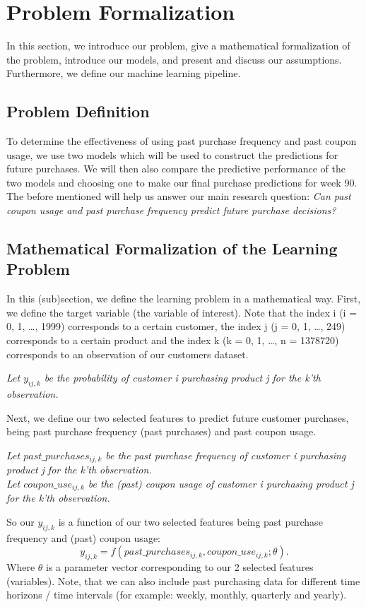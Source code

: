 \section{Problem Formalization}
In this section, we introduce our problem, give a mathematical formalization of
the problem, introduce our models, and present and discuss our assumptions.
Furthermore, we define our machine learning pipeline.

\subsection{Problem Definition}
To determine the effectiveness of using past purchase frequency and past coupon
usage, we use two models which will be used to construct the predictions for
future purchases. We will then also compare the predictive performance of the
two models and choosing one to make our final purchase predictions for week 90.
The before mentioned will help us answer our main research question:
\textit{Can past coupon usage and past purchase frequency predict future purchase decisions?}

\subsection{Mathematical Formalization of the Learning Problem}
In this (sub)section, we define the learning problem in a mathematical way.
First, we define the target variable (the variable of interest). Note that the
index i (i = 0, 1, \dots, 1999) corresponds to a certain customer, the index j (j = 0,
1, \dots, 249) corresponds to a certain product and the index k (k = 0, 1,
\dots, n = 1378720) corresponds to an observation of our customers
dataset.

\textit{Let $y_{ij,k}$ be the probability of customer i purchasing product j
for the k'th observation.}

Next, we define our two selected features to predict future customer purchases,
being past purchase frequency (past purchases) and past coupon usage.

\textit{Let $past\_purchases_{ij,k}$ be the past purchase frequency of 
customer i purchasing product j for the k'th observation.} \\
\textit{Let $coupon\_use_{ij,k}$ be the (past) coupon usage of 
customer i purchasing product j for the k'th observation.}

So our $y_{ij,k}$ is a function of our two selected features being past purchase
frequency and (past) coupon usage:
\begin{equation}
    y_{ij,k} = f(past\_purchases_{ij,k}, coupon\_use_{ij,k}; \theta).
\end{equation} Where $\theta$ is a parameter vector corresponding to our 2
selected features (variables). Note, that we can also include past purchasing
data for different time horizons / time intervals (for example: weekly, monthly,
quarterly and yearly).


